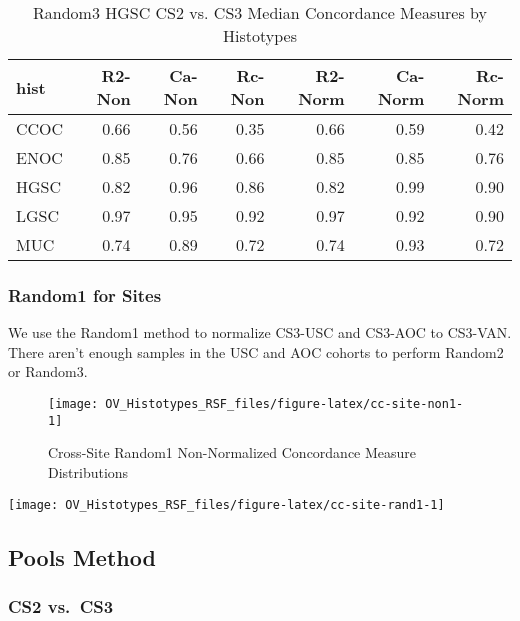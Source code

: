 \documentclass[
]{report}
\begin{document}
\begin{table}

\caption{\label{tab:rand3-hgsc-cs2-vs-cs3}Random3 HGSC CS2 vs. CS3 Median Concordance Measures by Histotypes}
\centering
\begin{tabular}[t]{l|r|r|r|r|r|r}
\hline
hist & R2-Non & Ca-Non & Rc-Non & R2-Norm & Ca-Norm & Rc-Norm\\
\hline
CCOC & 0.66 & 0.56 & 0.35 & 0.66 & 0.59 & 0.42\\
\hline
ENOC & 0.85 & 0.76 & 0.66 & 0.85 & 0.85 & 0.76\\
\hline
HGSC & 0.82 & 0.96 & 0.86 & 0.82 & 0.99 & 0.90\\
\hline
LGSC & 0.97 & 0.95 & 0.92 & 0.97 & 0.92 & 0.90\\
\hline
MUC & 0.74 & 0.89 & 0.72 & 0.74 & 0.93 & 0.72\\
\hline
\end{tabular}
\end{table}

\hypertarget{random1-for-sites}{%
\subsubsection{Random1 for Sites}\label{random1-for-sites}}

We use the Random1 method to normalize CS3-USC and CS3-AOC to CS3-VAN. There aren't enough samples in the USC and AOC cohorts to perform Random2 or Random3.

\begin{figure}[H]

{\centering \texttt{[image: OV\_Histotypes\_RSF\_files/figure-latex/cc-site-non1-1]} 

}

\caption{Cross-Site Random1 Non-Normalized Concordance Measure Distributions}\label{fig:cc-site-non1}
\end{figure}

\begin{center}\texttt{[image: OV\_Histotypes\_RSF\_files/figure-latex/cc-site-rand1-1]} \end{center}

\hypertarget{pools-method-1}{%
\subsection{Pools Method}\label{pools-method-1}}

\hypertarget{cs2-vs.-cs3}{%
\subsubsection{CS2 vs.~CS3}\label{cs2-vs.-cs3}}
\end{document}
